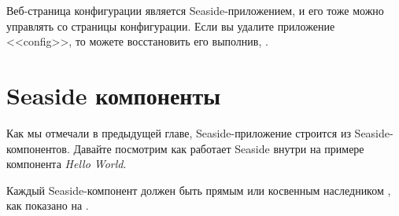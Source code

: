 \documentclass[a4paper,10pt,twoside]{book}
\begin{document}

Веб-страница конфигурации является Seaside-приложением, и его тоже можно управлять со страницы конфигурации.
Если вы удалите приложение <<config>>, то можете восстановить его выполнив,  .


\section{Seaside компоненты}



Как мы отмечали в предыдущей главе, Seaside-приложение строится из
Seaside-компонентов. Давайте посмотрим как работает Seaside внутри на
примере компонента \emph{Hello World}.


Каждый Seaside-компонент должен быть прямым или косвенным наследником ,
как показано на .



\end{document}
